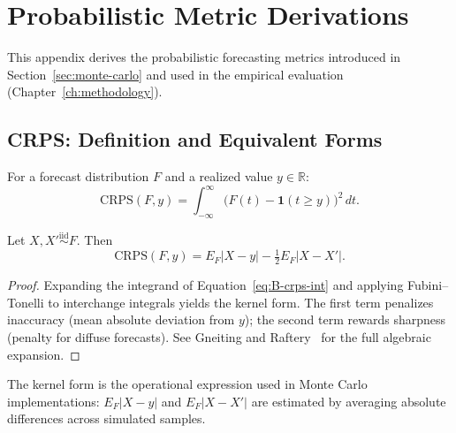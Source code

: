 \chapter{Probabilistic Metric Derivations}
\label{app:B}

This appendix derives the probabilistic forecasting metrics introduced in
Section~\ref{sec:monte-carlo} and used in the empirical evaluation
(Chapter~\ref{ch:methodology}).


\section{CRPS: Definition and Equivalent Forms}
\label{app:B-crps-def}

\begin{definition}
For a forecast distribution $F$ and a realized value $y \in \mathbb{R}$:
\begin{equation}
\label{eq:B-crps-int}
\mathrm{CRPS}(F, y)
= \int_{-\infty}^{\infty} \big( F(t) - \mathbf{1}(t \geq y) \big)^2 \, dt.
\end{equation}
\end{definition}

\begin{theorem}
\label{thm:H-kernel}
Let $X, X' \overset{\mathrm{iid}}{\sim} F$. Then
\begin{equation}
\label{eq:B-crps-kernel}
\mathrm{CRPS}(F, y) = E_F |X - y| - \tfrac{1}{2} E_F |X - X'|.
\end{equation}
\end{theorem}

\begin{proof}
Expanding the integrand of Equation~\ref{eq:B-crps-int} and applying
Fubini–Tonelli to interchange integrals yields the kernel form. The
first term penalizes inaccuracy (mean absolute deviation from $y$); the
second term rewards sharpness (penalty for diffuse forecasts). See
Gneiting and Raftery~\cite{gneiting2007strictly} for the full algebraic
expansion.
\end{proof}

The kernel form is the operational expression used in Monte Carlo
implementations: $E_F |X - y|$ and $E_F |X - X'|$ are estimated by
averaging absolute differences across simulated samples.


